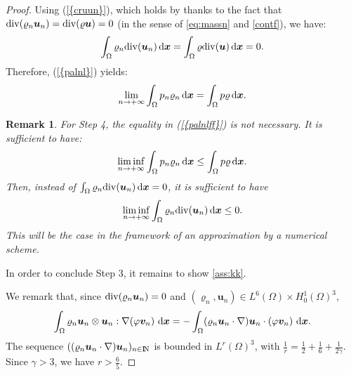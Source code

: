 \documentclass{amsart}
\newtheorem{rmq}{Remark}
\numberwithin{equation}{section}
\begin{document}
\begin{proof}
Using {(\ref{{cruun}})}, which holds by  \cite[Lemma 2.1]{eymard2010convergent} thanks to the fact that ${{\rm div}}({\varrho}_n {{\boldsymbol u}}_n) ={{\rm div}} ({\varrho} {{\boldsymbol u}})=0$
(in the sense of \eqref{eq:massn} and \eqref{contf}), we have:
$$\int_{\Omega} {\varrho}_n {{\rm div}}({{\boldsymbol u}}_n){\, {\rm d}{{\boldsymbol x}}}=\int_{\Omega} {\varrho} {{\rm div}}({{\boldsymbol u}}){\, {\rm d}{{\boldsymbol x}}}=0.$$ 
Therefore, {(\ref{{palnl}})} yields:
\begin{equation}
\lim_{{n {\rightarrow} + \infty}} \int_{\Omega} p_n  {\varrho}_n{\, {\rm d}{{\boldsymbol x}}}= \int_{\Omega} p {\varrho}{\, {\rm d}{{\boldsymbol x}}}.
\label{palnlff}
\end{equation}
\begin{rmq}
For Step 4, the equality in {(\ref{{palnlff}})} is not necessary. 
It is sufficient to have:
\begin{equation*} \liminf_{{n {\rightarrow} + \infty}} \int_{\Omega} p_n {\varrho}_n{\, {\rm d}{{\boldsymbol x}}}  \le  \int_{\Omega} p {\varrho}{\, {\rm d}{{\boldsymbol x}}}.
\end{equation*}
Then, instead of  $\int_{\Omega} {\varrho}_n {{\rm div}}({{\boldsymbol u}}_n){\, {\rm d}{{\boldsymbol x}}}=0$,  it is sufficient to have
\begin{equation*}
 \liminf_{{n {\rightarrow} + \infty}} \int_{\Omega} {\varrho}_n {{\rm div}}({{\boldsymbol u}}_n){\, {\rm d}{{\boldsymbol x}}} \le 0.
\end{equation*}
This will be the case in the framework of an approximation by a numerical scheme.
\end{rmq}

In order to conclude Step 3, it remains to show \eqref{ass:kk}.
 

We remark that, since ${{\rm div}}({\varrho}_n {{\boldsymbol u}}_n)=0$ and $({\varrho}_n,{{\boldsymbol u}}_n) \in L^6(\Omega)\times H_0^1(\Omega)^3 $,
$$
\int_\Omega {\varrho}_n {{\boldsymbol u}}_n \otimes {{\boldsymbol u}}_n : {{\nabla}} (\varphi {\bm{v}}_n) \,{\, {\rm d}{{\boldsymbol x}}} = -\int_\Omega ({\varrho}_n {{\boldsymbol u}}_n \cdot {{\nabla}} ){{\boldsymbol u}}_n \cdot(\varphi {\bm{v}}_n) \,{\, {\rm d}{{\boldsymbol x}}}.
$$
The sequence $(({\varrho}_n {{\boldsymbol u}}_n \cdot {{\nabla}} ){{\boldsymbol u}}_n)_{{n \in {\ifmmode{\rm	I\mkern-3.1mu
N\mkern0.5mu}\else{\rm I\kern-.16em
N\hskip0.5pt\ }\fi\relax}}}$ is bounded in $L^r(\Omega)^3$, with
$\frac 1 r = \frac 1 2 + \frac 1 6 + \frac 1 {2\gamma}$. Since $\gamma > 3$, we have $r >\frac 6 5$.


\end{proof}
\end{document}
